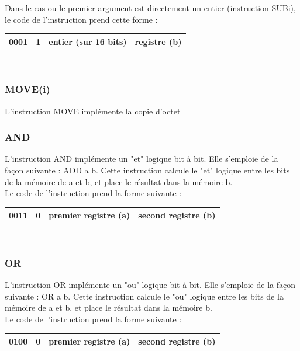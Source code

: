 \documentclass[a4paper, 12pt, twoside]{report}
\begin{document}
Dans le cas ou le premier argument est directement un entier (instruction SUBi),
le code de l'instruction prend cette forme :

\begin{tabular}{|c|c|c|c|}
  \hline
  0001 & 1 & entier (sur 16 bits) & registre (b) \\
  \hline
\end{tabular}\\

\subsubsection{MOVE(i)}

L'instruction MOVE implémente la copie d'octet


\subsubsection{AND}

L'instruction AND implémente un "et" logique bit à bit. Elle s'emploie de la façon suivante :
ADD a b. Cette instruction calcule le "et" logique entre les bits de la mémoire de a et b, 
et place le résultat dans la mémoire b.\\

Le code de l'instruction prend la forme suivante :

\begin{tabular}{|c|c|c|c|}
  \hline
  0011 & 0 & premier registre (a) & second registre (b) \\
  \hline
\end{tabular}\\

\subsubsection{OR}

L'instruction OR implémente un "ou" logique bit à bit. Elle s'emploie de la façon suivante :
OR a b. Cette instruction calcule le "ou" logique entre les bits de la mémoire de a et b, 
et place le résultat dans la mémoire b.\\

Le code de l'instruction prend la forme suivante :

\begin{tabular}{|c|c|c|c|}
  \hline
  0100 & 0 & premier registre (a) & second registre (b) \\
  \hline
\end{tabular}\\
\end{document}

